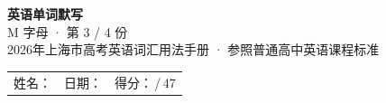 \documentclass[10pt,a4paper]{article}
\begin{document}
\pagestyle{plain}

\begin{center}
{\LARGE\bfseries 英语单词默写}\\[0.22em]
{\large M 字母 · 第 3 / 4 份}\\[0.18em]
{\small 2026年上海市高考英语词汇用法手册 · 参照普通高中英语课程标准}
\end{center}

\vspace{0.25em}
\noindent\begin{tabular}{@{}p{}@{}p{}@{}p{}@{}}
姓名：\underline{\hspace{2.0cm}} & 日期：\underline{\hspace{2.0cm}} & 得分：\underline{\hspace{1.3cm}}\,/\,47 \\
\end{tabular}

\vspace{0.3em}

\vspace{0.08em}
\end{document}

